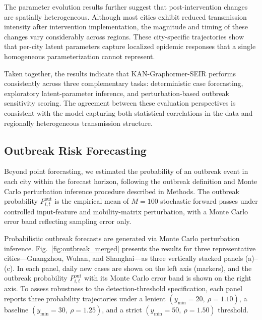 \documentclass[10pt,letterpaper]{article}
\begin{document}
	The parameter evolution results further suggest that post-intervention changes are spatially heterogeneous. Although most cities exhibit reduced transmission intensity after intervention implementation, the magnitude and timing of these changes vary considerably across regions. These city-specific trajectories show that per-city latent parameters capture localized epidemic responses that a single homogeneous parameterization cannot represent.
	
	
	Taken together, the results indicate that KAN-Graphormer-SEIR performs consistently across three complementary tasks: deterministic case forecasting, exploratory latent-parameter inference, and perturbation-based outbreak sensitivity scoring. The agreement between these evaluation perspectives is consistent with the model capturing both statistical correlations in the data and regionally heterogeneous transmission structure.
	
	\subsection*{Outbreak Risk Forecasting}
	
	Beyond point forecasting, we estimated the probability of an outbreak event in each
	city within the forecast horizon, following the outbreak definition and Monte Carlo
	perturbation inference procedure described in Methods. The outbreak probability
	$P_{i,t}^{\mathrm{out}}$ is the empirical mean of $M = 100$ stochastic forward passes
	under controlled input-feature and mobility-matrix perturbation, with a Monte Carlo
	error band reflecting sampling error only.
	
	Probabilistic outbreak forecasts are generated via Monte Carlo perturbation
	inference. Fig.~\ref{fig:outbreak_merged}
	presents the results for three representative cities---Guangzhou, Wuhan, and
	Shanghai---as three vertically stacked panels (a)--(c). In each panel, daily
	new cases are shown on the left axis (markers), and the outbreak probability
	$P_{i,t}^{\mathrm{out}}$ with its Monte Carlo error band is shown on the right axis. To assess robustness to the detection-threshold specification,
	each panel reports three probability trajectories under a lenient $(y_{\min}=20,\ \rho=1.10)$, a baseline $(y_{\min}=30,\ \rho=1.25)$, and a strict $(y_{\min}=50,\ \rho=1.50)$ threshold.
	
\end{document}
